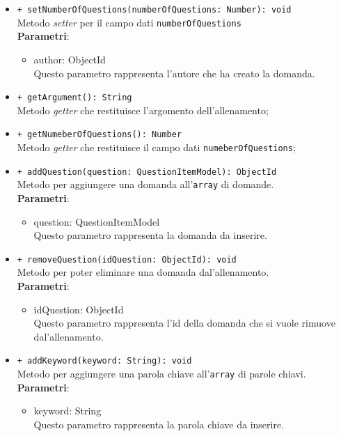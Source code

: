 \begin{itemize}
\begin{itemize}
				\item \texttt{+ setNumberOfQuestions(numberOfQuestions: Number): void} \\
				Metodo \textit{setter} per il campo dati \texttt{numberOfQuestions}\\
				\textbf{Parametri}:
				\begin{itemize}
					\item {author: ObjectId}\\
					Questo parametro rappresenta l'autore che ha creato la domanda.
				\end{itemize}
				
				\item \texttt{+ getArgument(): String} \\
				Metodo \textit{getter} che restituisce l'argomento dell'allenamento;
				
				\item \texttt{+ getNumeberOfQuestions(): Number} \\
				Metodo \textit{getter} che restituisce il campo dati \texttt{numeberOfQuestions};
				
				\item \texttt{+ addQuestion(question: QuestionItemModel): ObjectId} \\
				Metodo per aggiungere una domanda all'\texttt{array} di domande.\\
				\textbf{Parametri}:
				\begin{itemize}
					\item {question: QuestionItemModel}\\
					Questo parametro rappresenta la domanda da inserire.
				\end{itemize}
				
				\item \texttt{+ removeQuestion(idQuestion: ObjectId): void} \\
				Metodo per poter eliminare una domanda dal'allenamento.\\
				\textbf{Parametri}:
				\begin{itemize}
					\item {idQuestion: ObjectId}\\
					Questo parametro rappresenta l'id della domanda che si vuole rimuove dal'allenamento.
				\end{itemize}
				
				\item \texttt{+ addKeyword(keyword: String): void} \\
				Metodo per aggiungere una parola chiave all'\texttt{array} di parole chiavi.\\
				\textbf{Parametri}:
				\begin{itemize}
					\item {keyword: String}\\
					Questo parametro rappresenta la parola chiave da inserire.
				\end{itemize}
				

\end{itemize}
\end{itemize}
